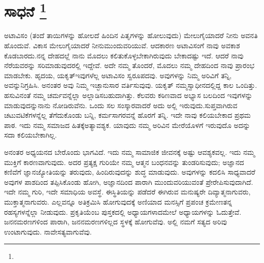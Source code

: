 
\vspace{-1cm}

\chapter[ಸಾಧನೆ ]{ಸಾಧನೆ \protect\footnote{}}

ಅಟಾವಿಸಂ (ತಂದೆ ತಾಯಿಗಳನ್ನು ಹೋಲದೆ ಹಿಂದಿನ ಪಿತೃಗಳನ್ನು ಹೋಲುವುದು) ಮೇಲುಗೈಯಾದರೆ ನೀನು ಅವನತಿ ಹೊಂದುವೆ. ವಿಕಾಸ ಮೇಲುಗೈಯಾದರೆ ನೀನು\break ಮುಂದುವರಿಯುವೆ. ಆದಕಾರಣ ಅಟಾವಿಸಂಗೆ ನಾವು ಅವಕಾಶ ಕೊಡಬಾರದು.\break ನನ್ನ ದೇಹದಲ್ಲೆ ನಾನು ಮೊದಲು ಕಲಿತುಕೊಳ್ಳಬೇಕಾಗಿರುವುದು ಬೇಕಾದಷ್ಟು ಇದೆ. ಆದರೆ ನಾವು ನೆರೆಯವರನ್ನು ಸರಿಮಾಡುವುದರಲ್ಲಿ ಇದ್ದೇವೆ. ಅದೇ ನಮ್ಮ ತೊಂದರೆ, ಮೊದಲು ನಮ್ಮ ದೇಹದಿಂದ ನಾವು ಪ್ರಾರಂಭ ಮಾಡಬೇಕು. ಹೃದಯ, ಯಕೃತ್​\break ಇವುಗಳೆಲ್ಲ ಅಟಾವಿಸಂ ಸ್ವರೂಪದವು. ಅವುಗಳನ್ನು ನಿಮ್ಮ ಅರಿವಿಗೆ ತನ್ನಿ, ಅವನ್ನು\break ನಿಗ್ರಹಿಸಿ. ಅನಂತರ ಅವು ನಿಮ್ಮ ಇಚ್ಛಾನುಸಾರ ವರ್ತಿಸುವುವು. ಯಕೃತ್​ ನಮ್ಮ\break ಸ್ವಾಧೀನದಲ್ಲಿದ್ದ ಕಾಲ ಒಂದಿತ್ತು. ಹಸುವಿನಂತೆ ನಮ್ಮ ಚರ್ಮವನ್ನೆಲ್ಲಾ ಅಲ್ಲಾಡಿಸಬಹುದಾಗಿತ್ತು. ಕೆಲವರು ಕಠಿಣವಾದ ಅಭ್ಯಾಸ ಬಲದಿಂದ ಇವುಗಳನ್ನು ಮಾಡುವುದನ್ನು\break ನಾನು ನೋಡಿರುವೆನು. ಒಂದು ಸಲ ಸಂಸ್ಕಾರವಾದರೆ ಅದು ಅಲ್ಲಿ ಇರುವುದು.\break ಸುಪ್ತವಾಗಿರುವ ಚಟುವಟಿಕೆಗಳನ್ನೆಲ್ಲ ತೆಗೆದುಕೊಂಡು ಬನ್ನಿ, ಕರ್ಮಸಾಗರವನ್ನೆ ಹೊರಗೆ ತನ್ನಿ. ಇದೇ ನಾವು ಕಲಿಯಬೇಕಾದ ಪ್ರಥಮ ಪಾಠ. ಇದು ನಮ್ಮ ಸಮಾಜದ ಹಿತಕ್ಕೆ\break ಅತ್ಯಾವಶ್ಯಕ. ಯಾವುದು ನಮ್ಮ ಅರಿವಿನ ಮೇರೆಯೊಳಗೆ ಇರುವುದೊ ಅದನ್ನು ಸದಾ ಕಲಿಯಬೇಕಾಗಿಲ್ಲ.

ಅನಂತರ ಅಧ್ಯಯನದ ಬೇರೊಂದು ಭಾಗವಿದೆ. ಇದು ನಮ್ಮ ಸಾಮಾಜಿಕ ಜೀವನಕ್ಕೆ ಅಷ್ಟು ಆವಶ್ಯಕವಲ್ಲ. ಇದು ನಮ್ಮ ಮುಕ್ತಿಗೆ ಕಾರಣವಾಗುವುದು. ಅದರ ಪ್ರತ್ಯಕ್ಷ ಗುರಿಯೇ ನಮ್ಮ ಆತ್ಮನ ಬಂಧನವನ್ನು ತುಂಡರಿಸುವುದು; ಅಜ್ಞಾನದ ಕಣಿವೆಗೆ ಜ್ಞಾನಜ್ಯೋತಿಯನ್ನು ತರುವುದು, ಹಿಂದಿರುವುದನ್ನು ಶುದ್ಧ ಮಾಡುವುದು. ಅವುಗಳನ್ನು ಕದಲಿಸಿ ಸಾಧ್ಯವಾದರೆ ಅವುಗಳ ಪಾಶದಿಂದ ತಪ್ಪಿಸಿಕೊಂಡು ಹೋಗಿ, ಅಜ್ಞಾನದಿಂದ ಪಾರಾಗಿ ಮುಂದುವರಿಯುವಂತೆ ಪ್ರೇರೇಪಿಸುವುದಾಗಿದೆ. ಇದೇ ನಮ್ಮ ಗುರಿ, ಇದೇ ಸಮಾಧಿಯ ಅವಸ್ಥೆ. ಈ\break ಸ್ಥಿತಿಯನ್ನು ಪಡೆದರೆ ಈಗಿರುವ ಮನುಷ್ಯರೇ ದಿವ್ಯಾತ್ಮನಾಗುವರು, ಮುಕ್ತಾತ್ಮನಾಗುವರು. ಎಲ್ಲವನ್ನೂ ಅತಿಕ್ರಮಿಸಿ ಹೋಗುವುದಕ್ಕೆ ಅಣಿಯಾದ ಮನಸ್ಸಿಗೆ ಪ್ರಪಂಚ ಕ್ರಮೇಣ\break ತನ್ನ ರಹಸ್ಯಗಳನ್ನೆಲ್ಲಾ ನೀಡುವುದು. ಪ್ರಕೃತಿಯೆಂಬ ಪುಸ್ತಕದಲ್ಲಿ ಅಧ್ಯಾಯಗಳಾದ\break ಮೇಲೆ ಅಧ್ಯಾಯಗಳನ್ನು ಓದುತ್ತೇವೆ. ಜನನಮರಣಗಳಿಂದ ಪಾರಾಗಿ, ಜನನಮರಣ\break ಗಳಿಲ್ಲದ ಸ್ಥಳಕ್ಕೆ ಹೋಗುವೆವು. ಅಲ್ಲಿ ನಮಗೆ ಸತ್ಯದ ಅರಿವು ಉಂಟಾಗುವುದು. ನಾವೇ\break ಸತ್ಯವಾಗುವೆವು.

